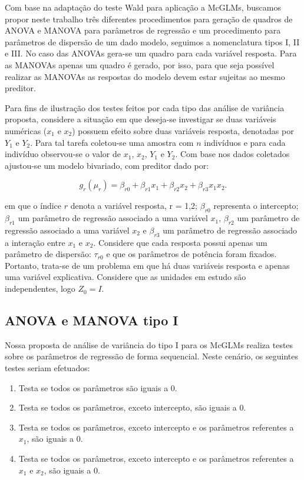 Com base na adaptação do teste Wald para aplicação a McGLMs, buscamos propor neste trabalho três diferentes procedimentos para geração de quadros de ANOVA e MANOVA para parâmetros de regressão e um procedimento para parâmetros de dispersão de um dado modelo, seguimos a nomenclatura tipos I, II e III. No caso das ANOVAs gera-se um quadro para cada variável resposta. Para as MANOVAs apenas um quadro é gerado, por isso, para que seja possível realizar as MANOVAs as respostas do modelo devem estar sujeitas ao mesmo preditor.

Para fins de ilustração dos testes feitos por cada tipo das análise de variância proposta, considere a situação em que deseja-se investigar se duas variáveis numéricas ($x_1$ e $x_2$) possuem efeito sobre duas variáveis resposta, denotadas por $Y_1$ e $Y_2$. Para tal tarefa coletou-se uma amostra com $n$ indivíduos e para cada indivíduo observou-se o valor de $x_1$, $x_2$, $Y_1$ e $Y_2$. Com base nos dados coletados ajustou-se um modelo bivariado, com preditor dado por:

\begin{equation}
g_r(\mu_r) = \beta_{r0} + \beta_{r1} x_1 + \beta_{r2} x_2 + \beta_{r3} x_1x_2.
\end{equation}

\noindent em que o índice $r$ denota a variável resposta, r = 1,2; $\beta_{r0}$ representa o intercepto; $\beta_{r1}$ um parâmetro de regressão associado a uma variável $x_1$, $\beta_{r2}$ um parâmetro de regressão associado a uma variável $x_2$ e $\beta_{r3}$ um parâmetro de regressão associado a interação entre $x_1$ e $x_2$. Considere que cada resposta possui apenas um parâmetro de dispersão: $\tau_{r0}$ e que os parâmetros de potência foram fixados. Portanto, trata-se de um problema em que há duas variáveis resposta e apenas uma variável explicativa. Considere que as unidades em estudo são independentes, logo $Z_0 = I$. 

\subsection{ANOVA e MANOVA tipo I}

Nossa proposta de análise de variância do tipo I para os McGLMs realiza testes sobre os parâmetros de regressão de forma sequencial. Neste cenário, os seguintes testes seriam efetuados:

\begin{enumerate}
  \item Testa se todos os parâmetros são iguais a 0.
  \item Testa se todos os parâmetros, exceto intercepto, são iguais a 0.
  \item Testa se todos os parâmetros, exceto intercepto e os parâmetros referentes a $x_1$, são iguais a 0.
  \item Testa se todos os parâmetros, exceto intercepto e os parâmetros referentes a $x_1$ e $x_2$, são iguais a 0.
\end{enumerate}


